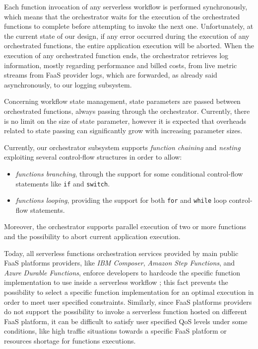 \documentclass[12pt,a4paper]{report}
\begin{document}
Each function invocation of any serverless workflow is performed synchronously, which means that the orchestrator waits for the execution of the orchestrated functions to complete before attempting to invoke the next one. Unfortunately, at the current state of our design, if any error occurred during the execution of any orchestrated functions, the entire application execution will be aborted. When the execution of any orchestrated function ends, the orchestrator retrieves log information, mostly regarding performance and billed costs, from live metric streams from FaaS provider logs, which are forwarded, as already said asynchronously, to our logging subsystem. 

Concerning workflow state management, state parameters are passed between orchestrated functions, always passing through the orchestrator. Currently, there is no limit on the size of state parameter, however it is expected that overheads related to state passing can significantly grow with increasing parameter sizes.

Currently, our orchestrator subsystem supports \textit{function chaining} and \textit{nesting} exploiting several control-flow structures in order to allow:

\begin{itemize}
	\item \textit{functions branching}, through the support for some conditional control-flow statements like \texttt{if} and \texttt{switch}.

	\item \textit{functions looping}, providing the support for both \texttt{for} and \texttt{while} loop control-flow statements.
\end{itemize}

Moreover, the orchestrator supports parallel execution of two or more functions and the possibility to abort current application execution.
	
Today, all serverless functions orchestration services provided by main public FaaS platforms providers, like \textit{IBM Composer}\cite{IBMComposer}, \textit{Amazon Step Functions}\cite{StepFunctions}, and \textit{Azure Durable Functions}\cite{DurableFunctions}, enforce developers to hardcode the specific function implementation to use inside a serverless workflow \cite{AFCL}; this fact prevents the possibility to select a specific function implementation for an optimal execution in order to meet user specified constraints. Similarly, since FaaS platforms providers do not support the possibility to invoke a serverless function hosted on different FaaS platform, it can be difficult to satisfy user specified QoS levels under some conditions, like high traffic situations towards a specific FaaS platform or resources shortage for functions executions.
\end{document}
